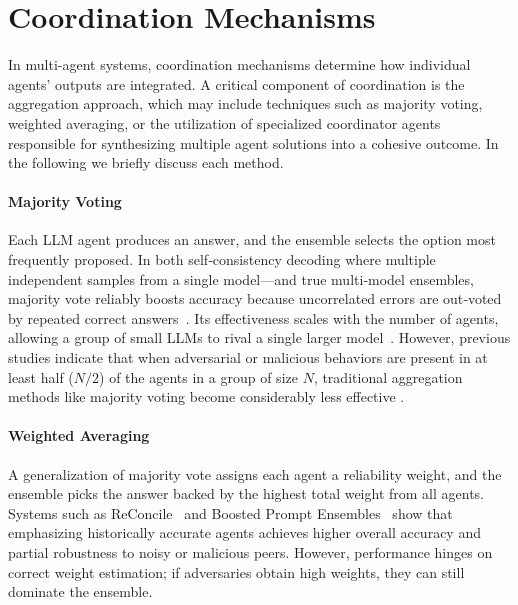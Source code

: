 \section{Coordination Mechanisms}\label{app:coord}



In multi-agent systems, coordination mechanisms determine how individual agents' outputs are integrated. %
A critical component of coordination is the aggregation approach, which may include techniques such as majority voting, weighted averaging, or the utilization of specialized coordinator agents responsible for synthesizing multiple agent solutions into a cohesive outcome. In the following we briefly discuss each method.

\paragraph{Majority Voting}
 Each LLM agent produces an answer, and the ensemble selects the option most frequently proposed. In both self‑consistency decoding where multiple independent samples from a single model—and true multi‑model ensembles, majority vote reliably boosts accuracy because uncorrelated errors are out‑voted by repeated correct answers~\cite{self-consistency}. Its effectiveness scales with the number of agents, allowing a group of small LLMs to rival a single larger model~\cite{more-agents}. However, previous studies indicate that when adversarial or malicious behaviors are present in at least half ($N/2$) of the agents in a group of size $N$, traditional aggregation methods like majority voting become considerably less effective \cite{more-agents, multiagent-debate-attack}.


\paragraph{Weighted Averaging}
A generalization of majority vote assigns each agent a reliability weight, and the ensemble picks the answer backed by the highest total weight from all agents. Systems such as ReConcile~\cite{reconcile} and Boosted Prompt Ensembles~\cite{boosted-prompt} show that emphasizing historically accurate agents achieves higher overall accuracy and partial robustness to noisy or malicious peers. However, performance hinges on correct weight estimation; if adversaries obtain high weights, they can still dominate the ensemble.

